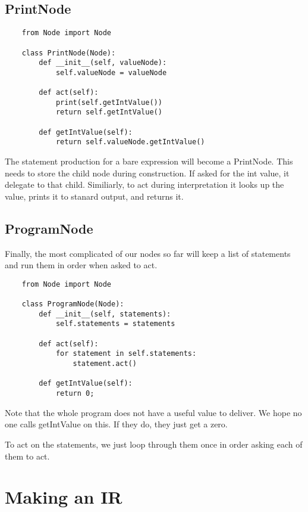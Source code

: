 \subsection{PrintNode}

{\footnotesize
\begin{verbatim}
    from Node import Node
  
    class PrintNode(Node):
        def __init__(self, valueNode):
            self.valueNode = valueNode

        def act(self):
            print(self.getIntValue())
            return self.getIntValue()

        def getIntValue(self):
            return self.valueNode.getIntValue()
\end{verbatim}
}

The statement production for a bare expression will become a PrintNode.
This needs to store the child node during construction. If asked
for the int value, it delegate to that child. Similiarly, to act
during interpretation it looks up the value, prints it to stanard output,
and returns it.

\subsection{ProgramNode}

Finally, the most complicated of our nodes so far will keep a list
of statements and run them in order when asked to act.

{\footnotesize
\begin{verbatim}
    from Node import Node
  
    class ProgramNode(Node):
        def __init__(self, statements):
            self.statements = statements

        def act(self):
            for statement in self.statements:
                statement.act()

        def getIntValue(self):
            return 0;
\end{verbatim}
}

Note that the whole program does not have a useful value to deliver.
We hope no one calls getIntValue on this. If they do, they just get
a zero.

To act on the statements, we just loop through them once in order
asking each of them to act.

\section{Making an IR}

